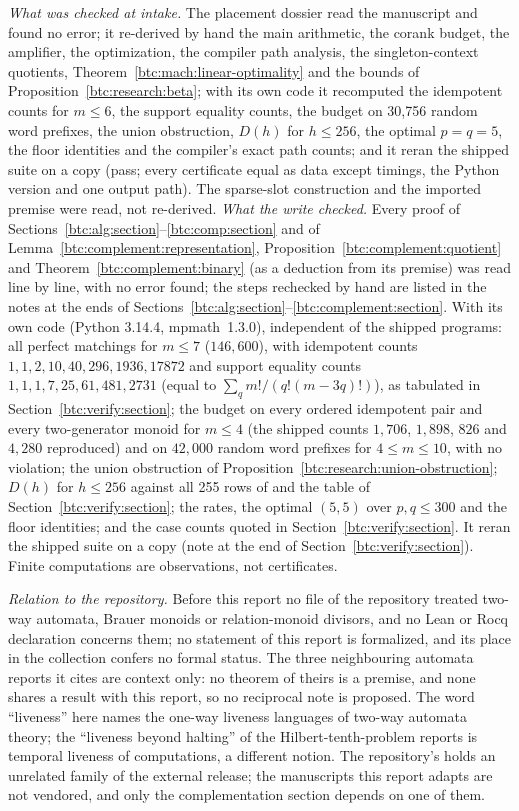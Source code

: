 \begin{writenote}
\emph{What was checked at intake.} The placement dossier read the
manuscript and found no error; it re-derived by hand the main arithmetic, the
corank budget, the amplifier, the optimization, the compiler path analysis,
the singleton-context quotients, Theorem~\ref{btc:mach:linear-optimality} and
the bounds of Proposition~\ref{btc:research:beta}; with its own code it
recomputed the idempotent counts for $m\le6$, the support equality counts,
the budget on 30{,}756 random word prefixes, the union obstruction, $D(h)$
for $h\le256$, the optimal $p=q=5$, the floor identities and the compiler's
exact path counts; and it reran the shipped suite on a copy (pass; every
certificate equal as data except timings, the Python version and one output
path). The sparse-slot construction and the imported premise were read, not
re-derived.
\emph{What the write checked.} Every proof of
Sections~\ref{btc:alg:section}--\ref{btc:comp:section} and of
Lemma~\ref{btc:complement:representation}, Proposition~\ref{btc:complement:quotient}
and Theorem~\ref{btc:complement:binary} (as a deduction from its premise) was
read line by line, with no error found; the steps rechecked by hand are listed
in the notes at the ends of Sections~\ref{btc:alg:section}--\ref{btc:complement:section}.
With its own code (Python 3.14.4, mpmath~1.3.0), independent of the shipped
programs: all perfect matchings for $m\le7$ ($146{,}600$), with idempotent
counts $1,1,2,10,40,296,1936,17872$ and support equality counts
$1,1,1,7,25,61,481,2731$ (equal to $\sum_q m!/(q!(m-3q)!)$), as tabulated in
Section~\ref{btc:verify:section}; the budget on every ordered idempotent
pair and every two-generator monoid for $m\le4$ (the shipped counts
$1{,}706$, $1{,}898$, $826$ and $4{,}280$ reproduced) and on $42{,}000$
random word prefixes for $4\le m\le10$, with no violation; the union
obstruction of Proposition~\ref{btc:research:union-obstruction}; $D(h)$ for
$h\le256$ against all 255 rows of  and
the table of Section~\ref{btc:verify:section}; the rates, the optimal $(5,5)$
over $p,q\le300$ and the floor identities; and the case counts quoted in
Section~\ref{btc:verify:section}. It reran the shipped suite on a copy (note
at the end of Section~\ref{btc:verify:section}). Finite computations are
observations, not certificates.

\emph{Relation to the repository.} Before this report no file of the
repository treated two-way automata, Brauer monoids or relation-monoid
divisors, and no Lean or Rocq declaration concerns them; no statement of this
report is formalized, and its place in the collection confers no formal
status. The three neighbouring automata reports it cites are context only: no
theorem of theirs is a premise, and none shares a result with this report, so
no reciprocal note is proposed. The word ``liveness'' here names the one-way
liveness languages of two-way automata theory; the ``liveness beyond halting''
of the Hilbert-tenth-problem reports is temporal liveness of computations, a
different notion. The repository's  holds an unrelated
family of the external release; the manuscripts this report adapts are not
vendored, and only the complementation section depends on one of them.
\end{writenote}
